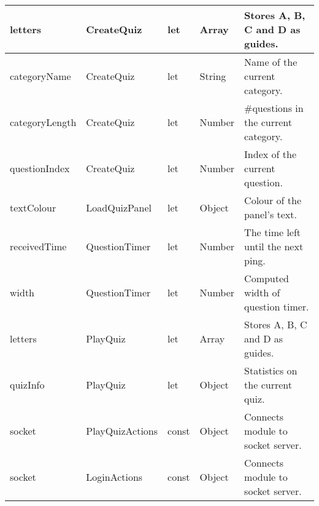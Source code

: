 \begin{table}[]
\begin{tabular}{|l|l|l|l|l|}
letters                             & CreateQuiz                           & let                                & Array                                & Stores A, B, C and D as guides.       \\ \hline
categoryName                        & CreateQuiz                           & let                                & String                               & Name of the current category.         \\ \hline
categoryLength                      & CreateQuiz                           & let                                & Number                               & \#questions in the current category.  \\ \hline
questionIndex                       & CreateQuiz                           & let                                & Number                               & Index of the current question.        \\ \hline
textColour                          & LoadQuizPanel                        & let                                & Object                               & Colour of the panel's text.           \\ \hline
receivedTime                        & QuestionTimer                        & let                                & Number                               & The time left until the next ping.    \\ \hline
width                               & QuestionTimer                        & let                                & Number                               & Computed width of question timer.     \\ \hline
letters                             & PlayQuiz                             & let                                & Array                                & Stores A, B, C and D as guides.       \\ \hline
quizInfo                            & PlayQuiz                             & let                                & Object                               & Statistics on the current quiz.       \\ \hline
socket                              & PlayQuizActions                      & const                              & Object                               & Connects module to socket server.     \\ \hline
socket                              & LoginActions                         & const                              & Object                               & Connects module to socket server.     \\ \hline

\end{tabular}
\end{table}
